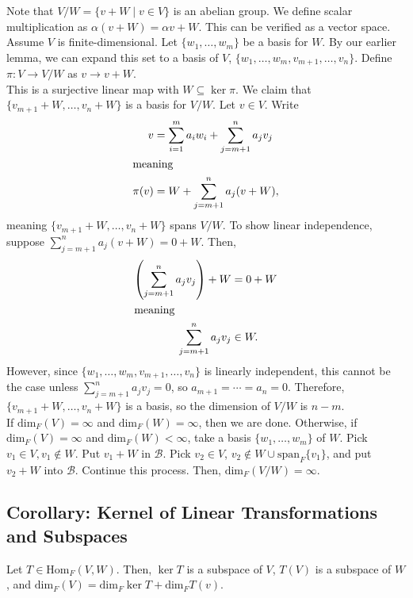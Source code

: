 \documentclass[10pt]{extarticle}
\begin{document}
  Note that $V/W = \{v+W\mid v\in V\}$ is an abelian group. We define scalar multiplication as $\alpha(v+W) = \alpha v + W$. This can be verified as a vector space.\\

  Assume $V$ is finite-dimensional. Let $\{w_1,\dots,w_m\}$ be a basis for $W$. By our earlier lemma, we can expand this set to a basis of $V$, $\{w_1,\dots,w_m,v_{m+1},\dots,v_n\}$. Define $\pi: V\rightarrow V/W$ as $v\rightarrow v+W$.\\

  This is a surjective linear map with $W\subseteq \ker\pi$. We claim that $\{v_{m+1}+W,\dots,v_{n}+W\}$ is a basis for $V/W$. Let $v\in V$. Write
  \begin{align*}
    v &= \sum_{i=1}^{m}a_iw_i + \sum_{j=m+1}^{n}a_jv_j\\
    \intertext{meaning}
    \pi(v) &= W + \sum_{j=m+1}^{n}a_j(v + W),
  \end{align*}
  meaning $\{v_{m+1}+W,\dots,v_{n}+ W\}$ spans $V/W$. To show linear independence, suppose $\sum_{j=m+1}^{n} a_j(v + W) = 0 + W$. Then,
  \begin{align*}
   \left(\sum_{j=m+1}^{n}a_jv_j\right) + W &= 0+W\\
   \intertext{meaning}
   \sum_{j=m+1}^{n}a_jv_j &\in W.
  \end{align*}
  However, since $\{w_1,\dots,w_m,v_{m+1},\dots,v_n\}$ is linearly independent, this cannot be the case unless $\sum_{j=m+1}^{n} a_jv_j = 0$, so $a_{m+1} = \cdots = a_n = 0$. Therefore, $\{v_{m+1}+W,\dots,v_{n}+W\}$ is a basis, so the dimension of $V/W$ is $n-m$.\\

  If $\text{dim}_{F}(V) = \infty$ and $\text{dim}_{F}(W) = \infty$, then we are done. Otherwise, if $\text{dim}_F(V) = \infty$ and $\text{dim}_F(W) < \infty$, take a basis $\{w_1,\dots,w_m\}$ of $W$. Pick $v_1\in V,v_1\notin W$. Put $v_1 + W$ in $\mathcal{B}$. Pick $v_{2}\in V$, $v_2\notin W\cup \text{span}_{F}\{v_1\}$, and put $v_2 + W$ into $\mathcal{B}$. Continue this process. Then, $\text{dim}_F(V/W) = \infty$.
  \subsection{Corollary: Kernel of Linear Transformations and Subspaces}%
  Let $T\in \text{Hom}_F(V,W)$. Then, $\ker T$ is a subspace of $V$, $T(V)$ is a subspace of $W$, and $\text{dim}_F(V) = \text{dim}_F\ker T + \text{dim}_F T(v)$.\\
\end{document}
